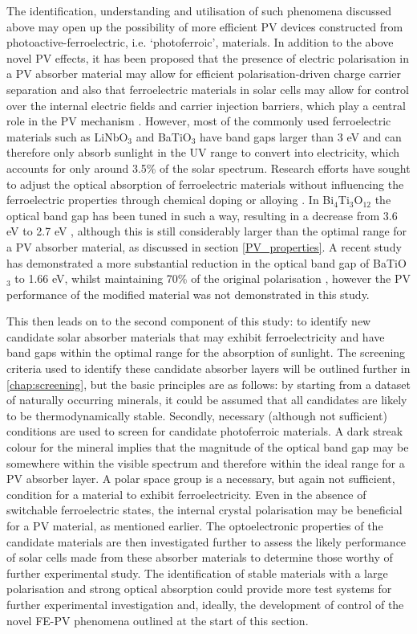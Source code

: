 \documentclass[11pt, twoside]{report}
\begin{document}
The identification, understanding and utilisation of such phenomena discussed above may open up the possibility of more efficient PV devices constructed from photoactive-ferroelectric, i.e. `photoferroic', materials.
In addition to the above novel PV effects, it has been proposed that the presence of electric polarisation in a PV absorber material may allow for efficient polarisation-driven charge carrier separation \cite{Jarv, FE-PV_lett} and also that ferroelectric materials in solar cells may allow for control over the internal electric fields and carrier injection barriers, which play a central role in the PV mechanism \cite{FE-PV_kirchartz}.
However, most of the commonly used ferroelectric materials such as LiNbO$_3$ and BaTiO$_3$ have band gaps larger than 3 eV and can therefore only absorb sunlight in the UV range to convert into electricity, which accounts for only around 3.5\% of the solar spectrum. Research efforts have sought to adjust the optical absorption of ferroelectric materials without influencing the ferroelectric properties through chemical doping or alloying \cite{FE_PV_rev1}. In Bi$_4$Ti$_3$O$_{12}$ the optical band gap has been tuned in such a way, resulting in a decrease from 3.6 eV to 2.7 eV \cite{FE_PV_rev1_83}, although this is still considerably larger than the optimal range for a PV absorber material, as discussed in section \ref{PV_properties}. A recent study has demonstrated a more substantial reduction in the optical band gap of BaTiO$_3$  to 1.66 eV, whilst maintaining 70\% of the original polarisation \cite{FE-PV_lett}, however the PV performance of the modified material was not demonstrated in this study. 

This then leads on to the second component of this study: to identify new candidate solar absorber materials that may exhibit ferroelectricity and have band gaps within the optimal range for the absorption of sunlight. The screening criteria used to identify these candidate absorber layers will be outlined further in \autoref{chap:screening}, but the basic principles are as follows: by starting from a dataset of naturally occurring minerals, it could be assumed that all candidates are likely to be thermodynamically stable. Secondly, necessary (although not sufficient) conditions are used to screen for candidate photoferroic materials. A dark streak colour for the mineral implies that the magnitude of the optical band gap may be somewhere within the visible spectrum and therefore within the ideal range for a PV absorber layer. A polar space group is a necessary, but again not sufficient, condition for a material to exhibit ferroelectricity. Even in the absence of switchable ferroelectric states, the internal crystal polarisation may be beneficial for a PV material, as mentioned earlier.
The optoelectronic properties of the candidate materials are then investigated further to assess the likely performance of solar cells made from these absorber materials to determine those worthy of further experimental study. The identification of stable materials with a large polarisation and strong optical absorption could provide more test systems for further experimental investigation and, ideally, the development of control of the novel FE-PV phenomena outlined at the start of this section.
\end{document}

